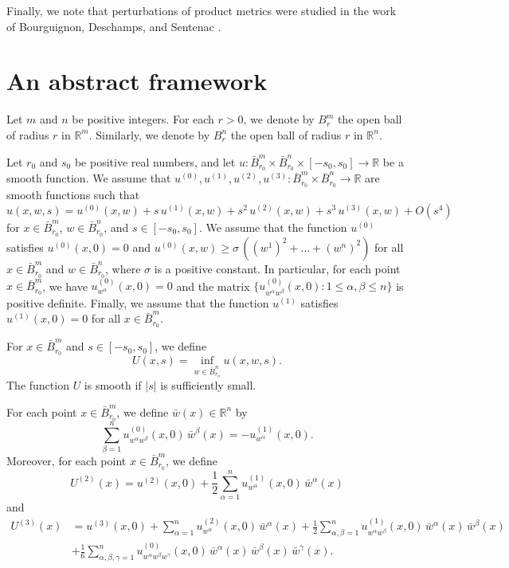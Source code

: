 \documentclass[11pt]{amsart}
\theoremstyle{definition}
\begin{document}
Finally, we note that perturbations of product metrics were studied in the work of Bourguignon, Deschamps, and Sentenac \cite{Bourguignon-Deschamps-Sentenac}.

\section{An abstract framework}\label{framework}

Let $m$ and $n$ be positive integers. For each $r>0$, we denote by $B_r^m$ the open ball of radius $r$ in $\mathbb{R}^m$. Similarly, we denote by $B_r^n$ the open ball of radius $r$ in $\mathbb{R}^n$. 

Let $r_0$ and $s_0$ be positive real numbers, and let $u: \bar{B}_{r_0}^m \times \bar{B}_{r_0}^n \times [-s_0,s_0] \to \mathbb{R}$ be a smooth function. We assume that $u^{(0)},u^{(1)},u^{(2)},u^{(3)}: \bar{B}_{r_0}^m \times \bar{B}_{r_0}^n \to \mathbb{R}$ are smooth functions such that 
\[u(x,w,s) = u^{(0)}(x,w) + s \, u^{(1)}(x,w) + s^2 \, u^{(2)}(x,w) + s^3 \, u^{(3)}(x,w) + O(s^4)\] 
for $x \in \bar{B}_{r_0}^m$, $w \in \bar{B}_{r_0}^n$, and $s \in [-s_0,s_0]$. We assume that the function $u^{(0)}$ satisfies $u^{(0)}(x,0) = 0$ and $u^{(0)}(x,w) \geq \sigma \, ((w^1)^2+\hdots+(w^n)^2)$ for all $x \in \bar{B}_{r_0}^m$ and $w \in \bar{B}_{r_0}^n$, where $\sigma$ is a positive constant. In particular, for each point $x \in \bar{B}_{r_0}^m$, we have $u^{(0)}_{w^\alpha}(x,0) = 0$ and the matrix $\{u^{(0)}_{w^\alpha w^\beta}(x,0): 1 \leq \alpha,\beta \leq n\}$ is positive definite. Finally, we assume that the function $u^{(1)}$ satisfies $u^{(1)}(x,0) = 0$ for all $x \in \bar{B}_{r_0}^m$.

For $x \in \bar{B}_{r_0}^m$ and $s \in [-s_0,s_0]$, we define 
\[U(x,s) = \inf_{w \in \bar{B}_{r_0}^n} u(x,w,s).\] 
The function $U$ is smooth if $|s|$ is sufficiently small. 

For each point $x \in \bar{B}_{r_0}^m$, we define $\bar{w}(x) \in \mathbb{R}^n$ by 
\begin{equation} 
\label{definition.of.bar.w}
\sum_{\beta=1}^n u^{(0)}_{w^\alpha w^\beta}(x,0) \, \bar{w}^\beta(x) = -u^{(1)}_{w^\alpha}(x,0). 
\end{equation}
Moreover, for each point $x \in \bar{B}_{r_0}^m$, we define 
\[U^{(2)}(x) = u^{(2)}(x,0) + \frac{1}{2} \sum_{\alpha=1}^n u^{(1)}_{w^\alpha}(x,0) \, \bar{w}^\alpha(x)\] 
and 
\begin{align*} 
U^{(3)}(x) 
&= u^{(3)}(x,0) + \sum_{\alpha=1}^n u^{(2)}_{w^\alpha}(x,0) \, \bar{w}^\alpha(x) + \frac{1}{2} \sum_{\alpha,\beta=1}^n u^{(1)}_{w^\alpha w^\beta}(x,0) \, \bar{w}^\alpha(x) \, \bar{w}^\beta(x) \\ 
&+ \frac{1}{6} \sum_{\alpha,\beta,\gamma=1}^n u^{(0)}_{w^\alpha w^\beta w^\gamma}(x,0) \, \bar{w}^\alpha(x) \, \bar{w}^\beta(x) \, \bar{w}^\gamma(x). 
\end{align*} 
\end{document}
